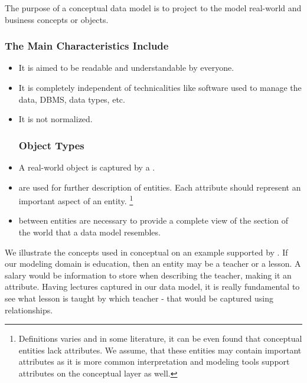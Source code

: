 The purpose of a conceptual data model is to project to the model real-world and business concepts or objects. \\

\subsubsection{The Main Characteristics Include}
\begin{itemize}
	\item It is aimed to be readable and understandable by everyone.
	\item It is completely independent of technicalities like software used to manage the data, DBMS, data types, etc.
	\item It is not normalized.
	\subsubsection{Object Types}
	\item A real-world object is captured by a .
	\item {} are used for further description of entities. 
	Each attribute should represent an important aspect of an entity. \footnote{Definitions varies and in some literature, it can be even found that conceptual entities lack attributes. We assume, that these entities may contain important attributes as it is more common interpretation and modeling tools support attributes on the conceptual layer as well.} 
	\item {} between entities are necessary to provide a complete view of the section of the world that a data model resembles.
\end{itemize}

We illustrate the concepts used in conceptual on an example supported by .
If our modeling domain is education, then an entity may be a teacher or a lesson. 
A salary would be information to store when describing the teacher, making it an attribute.
Having lectures captured in our data model, it is really fundamental to see what lesson is taught by which teacher - that would be captured using relationships.

